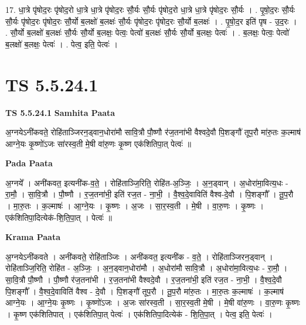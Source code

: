\documentclass[17pt]{extarticle}
\begin{document}
17. धा॒त्रे पृ॑षोद॒रः पृ॑षोद॒रो धा॒त्रे धा॒त्रे पृ॑षोद॒रः सौ॒र्यः सौ॒र्यः पृ॑षोद॒रो धा॒त्रे धा॒त्रे पृ॑षोद॒रः सौ॒र्यः । . पृ॒षो॒द॒रः सौ॒र्यः सौ॒र्यः पृ॑षोद॒रः पृ॑षोद॒रः सौ॒र्यो ब॒लक्षो॑ ब॒लक्षः॑ सौ॒र्यः पृ॑षोद॒रः पृ॑षोद॒रः सौ॒र्यो ब॒लक्षः॑ । . पृ॒षो॒द॒र इति॑ पृष - उ॒द॒रः । . सौ॒र्यो ब॒लक्षो॑ ब॒लक्षः॑ सौ॒र्यः सौ॒र्यो ब॒लक्षः॒ पेत्वः॒ पेत्वो॑ ब॒लक्षः॑ सौ॒र्यः सौ॒र्यो ब॒लक्षः॒ पेत्वः॑ । . ब॒लक्षः॒ पेत्वः॒ पेत्वो॑ ब॒लक्षो॑ ब॒लक्षः॒ पेत्वः॑ । . पेत्व॒ इति॒ पेत्वः॑ । \newline
\pagebreak
{}

\section{ TS 5.5.24.1 }

\textbf{TS 5.5.24.1 } \newline
\textbf{Samhita Paata} \newline

अ॒ग्नयेऽनी॑कवते॒ रोहि॑ताञ्जिरन॒ड्वान॒धोरा॑मौ सावि॒त्रौ पौ॒ष्णौ र॑ज॒तना॑भी वैश्वदे॒वौ पि॒शङ्गौ॑ तूप॒रौ मा॑रु॒तः क॒ल्माष॑ आग्ने॒यः कृ॒ष्णो॑ऽजः सा॑रस्व॒ती मे॒षी वा॑रु॒णः कृ॒ष्ण एक॑शितिपा॒त् पेत्वः॑ ॥ \newline

\textbf{Pada Paata} \newline

अ॒ग्नये᳚ । अनी॑कवत॒ इत्यनी॑क-व॒ते॒ । रोहि॑ताञ्जि॒रिति॒ रोहि॑त-अ॒ञ्जिः॒ । अ॒न॒ड्वान् । अ॒धोरा॑मा॒वित्य॒धः - रा॒मौ॒ । सा॒वि॒त्रौ । पौ॒ष्णौ । र॒ज॒तना॑भी॒ इति॑ रज॒त - ना॒भी॒ । वै॒श्व॒दे॒वाविति॑ वैश्व-दे॒वौ । पि॒शङ्गौ᳚ । तू॒प॒रौ । मा॒रु॒तः । क॒ल्माषः॑ । आ॒ग्ने॒यः । कृ॒ष्णः । अ॒जः । सा॒र॒स्व॒ती । मे॒षी । वा॒रु॒णः । कृ॒ष्णः । एक॑शितिपा॒दित्येक॑-शि॒ति॒पा॒त् । पेत्वः॑ ॥  \newline


\textbf{Krama Paata} \newline

अ॒ग्नयेऽनी॑कवते । अनी॑कवते॒ रोहि॑ताञ्जिः । अनी॑कवत॒ इत्यनी॑क - व॒ते॒ । रोहि॑ताञ्जिरन॒ड्वान् । रोहि॑ताञ्जि॒रिति॒ रोहि॑त - अ॒ञ्जिः॒ । अ॒न॒ड्वान॒धोरा॑मौ । अ॒धोरा॑मौ सावि॒त्रौ । अ॒धोरा॑मा॒वित्य॒धः - रा॒मौ॒ । सा॒वि॒त्रौ पौ॒ष्णौ । पौ॒ष्णौ र॑ज॒तना॑भी । र॒ज॒तना॑भी वैश्वदे॒वौ । र॒ज॒तना॑भी॒ इति॑ रज॒त - ना॒भी॒ । वै॒श्व॒दे॒वौ पि॒शङ्गौ᳚ । वै॒श्व॒दे॒वाविति॑ वैश्व - दे॒वौ । पि॒शङ्गौ॑ तूप॒रौ । तू॒प॒रौ मा॑रु॒तः । मा॒रु॒तः क॒ल्माषः॑ । क॒ल्माष॑ आग्ने॒यः । आ॒ग्ने॒यः कृ॒ष्णः । कृ॒ष्णो॑ऽजः । अ॒जः सा॑रस्व॒ती । सा॒र॒स्व॒ती मे॒षी । मे॒षी वा॑रु॒णः । वा॒रु॒णः कृ॒ष्णः । कृ॒ष्ण एक॑शितिपात् । एक॑शितिपा॒त् पेत्वः॑ । एक॑शितिपा॒दित्येक॑ - शि॒ति॒पा॒त् । पेत्व॒ इति॒ पेत्वः॑ । \newline
\end{document}
